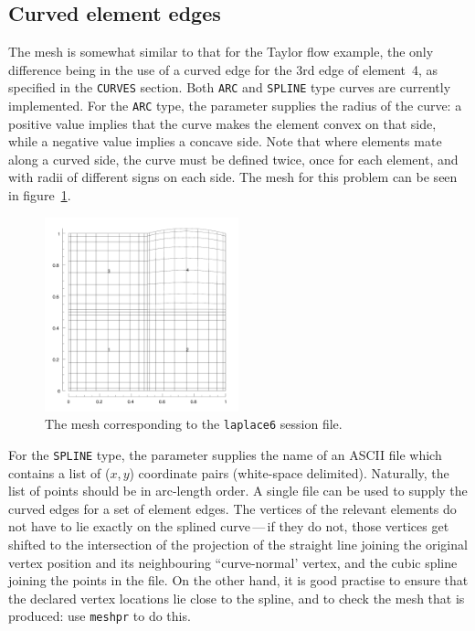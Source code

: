 \documentclass[11pt]{report}
\begin{document}
\subsection{Curved element edges}
\label{sec.curves}

The mesh is somewhat similar to that for the Taylor flow example, the
only difference being in the use of a curved edge for the 3rd edge of
element~4, as specified in the \texttt{CURVES} section.  Both
\texttt{ARC} and \texttt{SPLINE} type curves are currently
implemented.  For the \texttt{ARC} type, the parameter supplies the
radius of the curve: a positive value implies that the curve makes the
element convex on that side, while a negative value implies a concave
side.  Note that where elements mate along a curved side, the curve
must be defined twice, once for each element, and with radii of
different signs on each side.  The mesh for this problem can be seen
in figure~\ref{lapcurve}.

\begin{figure}
\begin{center}
\includegraphics[width=0.5\textwidth]{laplace6mesh}
\end{center}
\caption{
\label{lapcurve}
  The mesh corresponding to the \texttt{laplace6} session file.
}
\end{figure}

For the \texttt{SPLINE} type, the parameter supplies the name of an
ASCII file which contains a list of ($x$,\,$y$) coordinate pairs
(white-space delimited). Naturally, the list of points should be in
arc-length order. A single file can be used to supply the curved edges
for a set of element edges. The vertices of the relevant elements do
not have to lie exactly on the splined curve\,---\,if they do not,
those vertices get shifted to the intersection of the projection of
the straight line joining the original vertex position and its
neighbouring ``curve-normal' vertex, and the cubic spline joining the
points in the file. On the other hand, it is good practise to ensure
that the declared vertex locations lie close to the spline, and to
check the mesh that is produced: use \texttt{meshpr} to do this.
\end{document}
